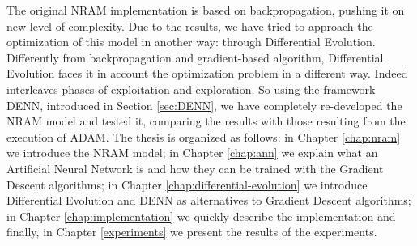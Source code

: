 The original NRAM implementation is based on backpropagation, pushing it on new level of complexity. Due to the results, we have tried to approach the optimization of this model in another way: through Differential Evolution. Differently from backpropagation and gradient-based algorithm, Differential Evolution faces it in account the optimization problem in a different way. Indeed interleaves phases of exploitation and exploration. So using the framework DENN, introduced in Section \ref{sec:DENN}, we have completely re-developed the NRAM model and tested it, comparing the results with those resulting from the execution of ADAM.\newline\newline
The thesis is organized as follows: in Chapter \ref{chap:nram} we introduce the NRAM model; in Chapter \ref{chap:ann} we explain what an Artificial Neural Network is and how they can be trained with the Gradient Descent algorithms; in Chapter \ref{chap:differential-evolution} we introduce Differential Evolution and DENN as alternatives to Gradient Descent algorithms; in Chapter \ref{chap:implementation} we quickly describe the implementation and finally, in Chapter \ref{experiments} we present the results of the experiments.